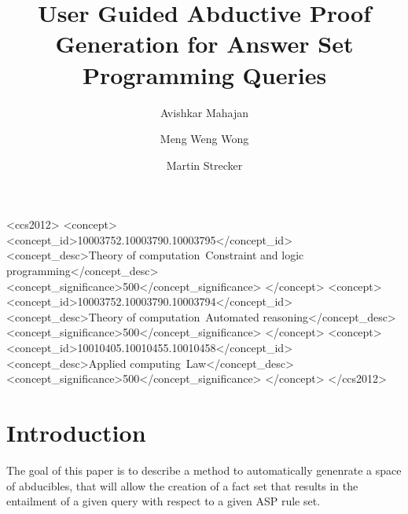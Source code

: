 \documentclass[sigconf]{acmart}
\begin{document}
\title{User Guided Abductive Proof Generation for Answer Set Programming
  Queries}

\author{Avishkar Mahajan}
\author{Meng Weng Wong}

\author{Martin Strecker}



\begin{CCSXML}
<ccs2012>
   <concept>
       <concept_id>10003752.10003790.10003795</concept_id>
       <concept_desc>Theory of computation~Constraint and logic programming</concept_desc>
       <concept_significance>500</concept_significance>
       </concept>
   <concept>
       <concept_id>10003752.10003790.10003794</concept_id>
       <concept_desc>Theory of computation~Automated reasoning</concept_desc>
       <concept_significance>500</concept_significance>
       </concept>
   <concept>
       <concept_id>10010405.10010455.10010458</concept_id>
       <concept_desc>Applied computing~Law</concept_desc>
       <concept_significance>500</concept_significance>
       </concept>
 </ccs2012>
\end{CCSXML}


\maketitle


\section{Introduction}
The goal of this paper is to describe a method to automatically genenrate a space of abducibles, that will allow the creation of a fact set that results in the entailment of a given query with respect to a given ASP rule set. \\
\end{document}
